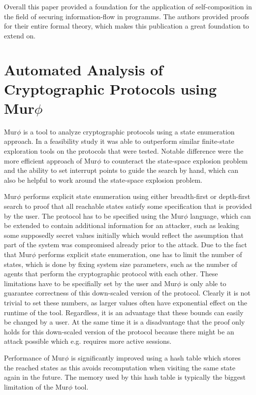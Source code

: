 \documentclass[a4paper,UKenglish]{lipics-v2018}
\def\murphi{Mur$\phi$ }
\begin{document}
Overall this paper provided a foundation for the application of self-composition in the field of securing information-flow in programms. The authors provided proofs for their entire formal theory, which makes this publication a great foundation to extend on.




\section{Automated Analysis of Cryptographic Protocols using \murphi}

\murphi is a tool to analyze cryptographic protocols using a state enumeration approach. In a feasibility study it was able to outperform similar finite-state exploration tools on the protocols that were tested. Notable difference were the more efficient approach of \murphi to counteract the state-space explosion problem and the ability to set interrupt points to guide the search by hand, which can also be helpful to work around the state-space explosion problem.\cite{murphi}

\murphi performs explicit state enumeration using either breadth-first or depth-first search to proof that all reachable states satisfy some specification that is provided by the user. The protocol has to be specified using the \murphi language, which can be extended to contain additional information for an attacker, such as leaking some supposedly secret values initially which would reflect the assumption that part of the system was compromised already prior to the attack. Due to the fact that \murphi performs explicit state enumeration, one has to limit the number of states, which is done by fixing system size parameters, such as the number of agents that perform the cryptographic protocol with each other. These limitations have to be specifially set by the user and \murphi is only able to guarantee correctness of this down-scaled version of the protocol. Clearly it is not trivial to set these numbers, as larger values often have exponential effect on the runtime of the tool.\cite{murphi} Regardless, it is an advantage that these bounds can easily be changed by a user. At the same time it is a disadvantage that the proof only holds for this down-scaled version of the protocol because there might be an attack possible which e.g. requires more active sessions.

Performance of \murphi is significantly improved using a hash table which stores the reached states as this avoids recomputation when visiting the same state again in the future. The memory used by this hash table is typically the biggest limitation of the \murphi tool.\cite{murphi}
\end{document}
